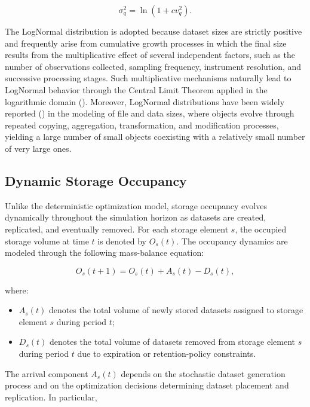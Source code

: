\documentclass[a4paper,fleqn]{cas-dc}
\begin{document}
\begin{equation} 
\sigma_q^2 = \ln(1+cv_q^2). 
\end{equation}

The LogNormal distribution is adopted because dataset sizes are strictly positive and frequently arise from cumulative growth processes in which the final size results from the multiplicative effect of several independent factors, such as the number of observations collected, sampling frequency, instrument resolution, and successive processing stages. Such multiplicative mechanisms naturally lead to LogNormal behavior through the Central Limit Theorem applied in the logarithmic domain (\citealp{Guerrero2020,Zhang2024}). Moreover, LogNormal distributions have been widely reported (\citealp{Mitzenmacher2004}) in the modeling of file and data sizes, where objects evolve through repeated copying, aggregation, transformation, and modification processes, yielding a large number of small objects coexisting with a relatively small number of very large ones.

\subsection*{Dynamic Storage Occupancy}

Unlike the deterministic optimization model, storage occupancy evolves dynamically throughout the simulation horizon as datasets are created, replicated, and eventually removed. For each storage element \(s\), the occupied storage volume at time \(t\) is denoted by \(O_s(t)\). The occupancy dynamics are modeled through the following mass-balance equation:

\begin{equation} 
O_s(t+1) = O_s(t) + A_s(t) - D_s(t), 
\end{equation} 

where: 

\begin{itemize} 
\item \(A_s(t)\) denotes the total volume of newly stored datasets assigned to storage element \(s\) during period \(t\); 
\item \(D_s(t)\) denotes the total volume of datasets removed from storage element \(s\) during period \(t\) due to expiration or retention-policy constraints. 
\end{itemize} 

The arrival component \(A_s(t)\) depends on the stochastic dataset generation process and on the optimization decisions determining dataset placement and replication. In particular, 
\end{document}

